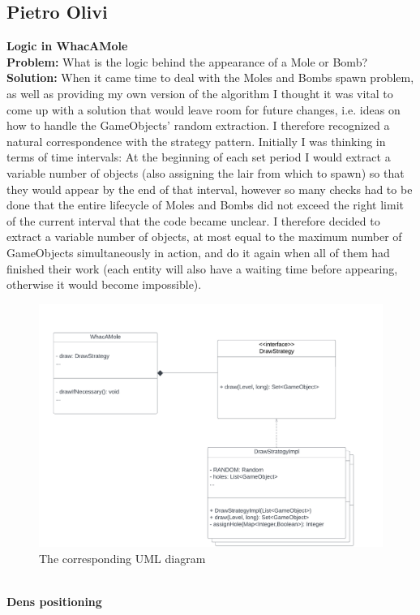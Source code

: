 \documentclass[a4paper,12pt]{report}
\begin{document}
\subsection*{Pietro Olivi}
\textbf{Logic in WhacAMole}\\
\textbf{Problem:} What is the logic behind the appearance of a Mole or Bomb?\\
\textbf{Solution:} When it came time to deal with the Moles and Bombs spawn problem, as well as providing my own version of the algorithm
I thought it was vital to come up with a solution that would leave room for future changes, i.e. ideas on how to handle the GameObjects’
random extraction. I therefore recognized a natural correspondence with the strategy pattern. Initially I was thinking in terms of time
intervals: At the beginning of each set period I would extract a variable number of objects (also assigning the lair from which to spawn)
so that they would appear by the end of that interval, however so many checks had to be done that the entire lifecycle of Moles and Bombs
did not exceed the right limit of the current interval that the code became unclear. I therefore decided to extract a variable number of
objects, at most equal to the maximum number of GameObjects simultaneously in action, and do it again when all of them had finished their
work (each entity will also have a waiting time before appearing, otherwise it would become impossible).
\begin{figure}[ht]
	\centering
	\includegraphics[width=380pt]{res/DrawStrategy.pdf}
	\caption{The corresponding UML diagram}
\end{figure}
\pagebreak\\
\textbf{Dens positioning}\\
\end{document}
